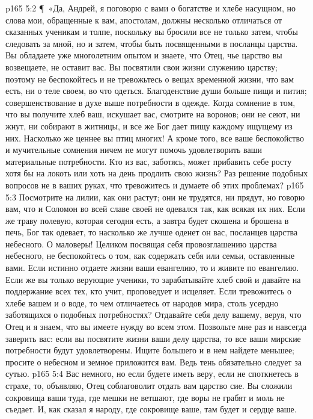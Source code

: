 \vs p165 5:2 \P\ «Да, Андрей, я поговорю с вами о богатстве и хлебе насущном, но слова мои, обращенные к вам, апостолам, должны несколько отличаться от сказанных ученикам и толпе, поскольку вы бросили все не только затем, чтобы следовать за мной, но и затем, чтобы быть посвященными в посланцы царства. Вы обладаете уже многолетним опытом и знаете, что Отец, чье царство вы возвещаете, не оставит вас. Вы посвятили свои жизни служению царству; поэтому не беспокойтесь и не тревожьтесь о вещах временной жизни, что вам есть, ни о теле своем, во что одеться. Благоденствие души больше пищи и пития; совершенствование в духе выше потребности в одежде. Когда сомнение в том, что вы получите хлеб ваш, искушает вас, смотрите на воронов; они не сеют, ни жнут, ни собирают в житницы, и все же Бог дает пищу каждому ищущему из них. Насколько же ценнее вы птиц многих! А кроме того, все ваше беспокойство и мучительные сомнения ничем не могут помочь удовлетворить ваши материальные потребности. Кто из вас, заботясь, может прибавить себе росту хотя бы на локоть или хоть на день продлить свою жизнь? Раз решение подобных вопросов не в ваших руках, что тревожитесь и думаете об этих проблемах?
\vs p165 5:3 Посмотрите на лилии, как они растут; они не трудятся, ни прядут, но говорю вам, что и Соломон во всей славе своей не одевался так, как всякая их них. Если же траву полевую, которая сегодня есть, а завтра будет скошена и брошена в печь, Бог так одевает, то насколько же лучше оденет он вас, посланцев царства небесного. О маловеры! Целиком посвящая себя провозглашению царства небесного, не беспокойтесь о том, как содержать себя или семьи, оставленные вами. Если истинно отдаете жизни ваши евангелию, то и живите по евангелию. Если же вы только верующие ученики, то зарабатывайте хлеб свой и давайте на поддержание всех тех, кто учит, проповедует и исцеляет. Если тревожитесь о хлебе вашем и о воде, то чем отличаетесь от народов мира, столь усердно заботящихся о подобных потребностях? Отдавайте себя делу вашему, веруя, что Отец и я знаем, что вы имеете нужду во всем этом. Позвольте мне раз и навсегда заверить вас: если вы посвятите жизни ваши делу царства, то все ваши мирские потребности будут удовлетворены. Ищите большего и в нем найдете меньшее; просите о небесном и земное приложится вам. Ведь тень обязательно следует за сутью.
\vs p165 5:4 Вас немного, но если будете иметь веру, если не споткнетесь в страхе, то, объявляю, Отец соблаговолит отдать вам царство сие. Вы сложили сокровища ваши туда, где мешки не ветшают, где воры не грабят и моль не съедает. И, как сказал я народу, где сокровище ваше, там будет и сердце ваше.
